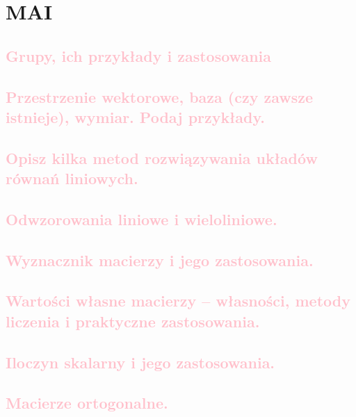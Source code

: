 \chapter{MAI}

\section{\textcolor{pink}{Grupy, ich przykłady i zastosowania}}


\section{\textcolor{pink}{Przestrzenie wektorowe, baza (czy zawsze istnieje), wymiar. Podaj przykłady.}}


\section{\textcolor{pink}{Opisz kilka metod rozwiązywania układów równań liniowych.}}


\section{\textcolor{pink}{Odwzorowania liniowe i wieloliniowe.}}


\section{\textcolor{pink}{Wyznacznik macierzy i jego zastosowania.}}


\section{\textcolor{pink}{Wartości własne macierzy -- własności, metody liczenia i praktyczne zastosowania.} }


\section{\textcolor{pink}{Iloczyn skalarny i jego zastosowania.}}


\section{\textcolor{pink}{Macierze ortogonalne.}}


